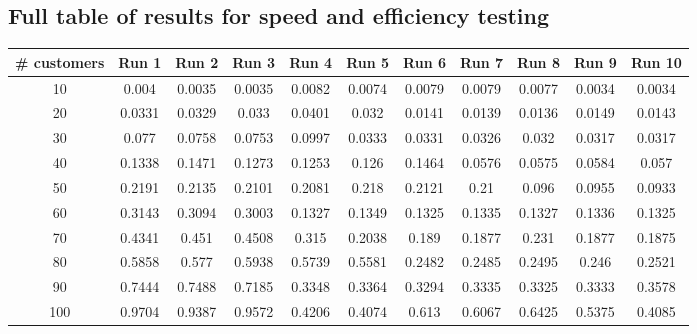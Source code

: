 \documentclass[a4paper]{article}
\begin{document}
        \subsection{Full table of results for speed and efficiency testing}
        \begin{minipage}{\textwidth}
            \centering
            \begin{tabular}{ c c c c c c c c c c c }
                \# customers & Run 1  & Run 2 & Run 3 & Run 4 & Run 5 & Run 6 & Run 7 & Run 8 & Run 9 & Run 10 \\
                \hline
                \hline
                10   & 0.004   & 0.0035        & 0.0035        & 0.0082        & 0.0074        & 0.0079        & 0.0079        & 0.0077        & 0.0034        & 0.0034    \\
                20   & 0.0331  & 0.0329        & 0.033         & 0.0401        & 0.032         & 0.0141        & 0.0139        & 0.0136        & 0.0149        & 0.0143    \\
                30   & 0.077   & 0.0758        & 0.0753        & 0.0997        & 0.0333        & 0.0331        & 0.0326        & 0.032         & 0.0317        & 0.0317    \\
                40   & 0.1338  & 0.1471        & 0.1273        & 0.1253        & 0.126         & 0.1464        & 0.0576        & 0.0575        & 0.0584        & 0.057     \\
                50   & 0.2191  & 0.2135        & 0.2101        & 0.2081        & 0.218         & 0.2121        & 0.21          & 0.096         & 0.0955        & 0.0933    \\
                60   & 0.3143  & 0.3094        & 0.3003        & 0.1327        & 0.1349        & 0.1325        & 0.1335        & 0.1327        & 0.1336        & 0.1325    \\
                70   & 0.4341  & 0.451         & 0.4508        & 0.315         & 0.2038        & 0.189         & 0.1877        & 0.231         & 0.1877        & 0.1875    \\
                80   & 0.5858  & 0.577         & 0.5938        & 0.5739        & 0.5581        & 0.2482        & 0.2485        & 0.2495        & 0.246         & 0.2521    \\
                90   & 0.7444  & 0.7488        & 0.7185        & 0.3348        & 0.3364        & 0.3294        & 0.3335        & 0.3325        & 0.3333        & 0.3578    \\
                100  & 0.9704  & 0.9387        & 0.9572        & 0.4206        & 0.4074        & 0.613         & 0.6067        & 0.6425        & 0.5375        & 0.4085    \\

\end{tabular}
\end{minipage}
\end{document}
